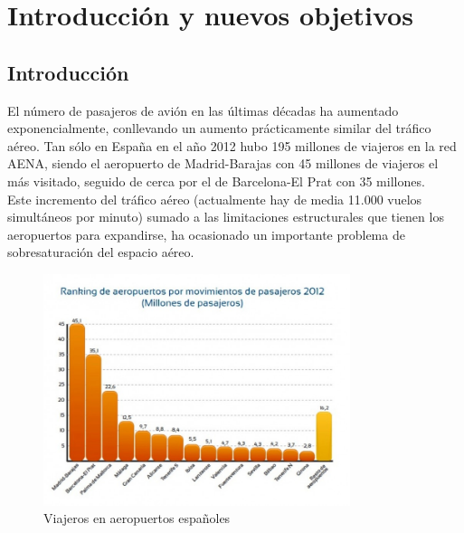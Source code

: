 \chapter{Introducción y nuevos objetivos}
\label{introduccción}
\section{Introducción}
El número de pasajeros de avión en las últimas décadas ha aumentado exponencialmente, conllevando un aumento prácticamente similar del tráfico aéreo. Tan sólo en España en el año 2012 hubo 195 millones de viajeros en la red AENA, siendo el aeropuerto de Madrid-Barajas con 45 millones de viajeros el más visitado, seguido de cerca por el de Barcelona-El Prat con 35 millones. \\
Este incremento del tráfico aéreo (actualmente hay de media 11.000 vuelos simultáneos por minuto) sumado a las limitaciones estructurales que tienen los aeropuertos para expandirse, ha ocasionado un importante problema de sobresaturación del espacio aéreo.
\begin{figure}[H]
	\begin{center}
		\centering
		\includegraphics[width=0.8\textwidth]{./imagenes/introduccion/Ranking_de_aeropuertos_espayoles_por_pasajeros_horiz.jpg}
		\caption{Viajeros en aeropuertos españoles}
		\label{fig: Viajeros en aeropuertos españoles}
	\end{center}
\end{figure}	

